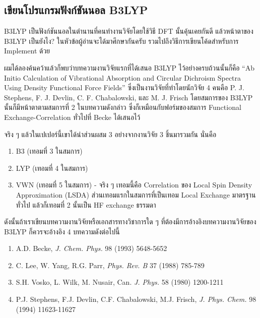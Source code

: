 \subsection{เขียนโปรแกรมฟังก์ชันนอล B3LYP}

B3LYP เป็นฟังก์ชันนอลในตำนานที่คนทำงานวิจัยโดยใช้วิธี DFT นั้นคุ้นเคยกันดี แล้วหน้าตาของ B3LYP เป็นยังไง? ในหัวข้อผู้อ่านจะได้มาศึกษากันครับ
รวมไปถึงวิธีการเขียนโค้ดสำหรับการ Implement ด้วย

ผมได้ลองค้นคว้าแล้วก็พบว่าบทความงานวิจัยแรกที่ได้เสนอ B3LYP ไว้อย่างครบถ้วนนั้นก็คือ \enquote{Ab Initio Calculation of Vibrational
  Absorption and Circular Dichroism Spectra Using Density Functional Force Fields}\autocite{stephens1994}
ซึ่งเป็นงานวิจัยที่ทำโดยนักวิจัย 4 คนคือ P. J. Stephens, F. J. Devlin, C. F. Chabalowski, และ M. J. Frisch โดยสมการของ
B3LYP นั้นก็มีหน้าตาตามสมการที่ 2 ในบทความดังกล่าว ซึ่งก็เหมือนกับฟอร์มของสมการ Functional Exchange-Correlation ทั่วไปที่ Becke
ได้เสนอไว้

จริง ๆ แล้วในเปเปอร์นี้เขาได้นำส่วนผสม 3 อย่างจากงานวิจัย 3 ชิ้นมารวมกัน นั่นคือ

\begin{enumerate}[topsep=0pt,noitemsep]
  \item B3 (เทอมที่ 3 ในสมการ)

  \item LYP (เทอมที่ 4 ในสมการ)

  \item VWN (เทอมที่ 5 ในสมการ) - จริง ๆ เทอมนี้คือ Correlation ของ Local Spin Density Approximation (LSDA)
        ส่วนเทอมแรกในสมการที่เป็นเทอม Local Exchange มาตรฐานทั่วไป แล้วก็เทอมที่ 2 นั้นเป็น HF exchange ธรรมดา
\end{enumerate}

ดังนั้นถ้าเราเขียนบทความงานวิจัยหรือเอกสารทางวิชาการใด ๆ ที่ต้องมีการอ้างอิงบทความงานวิจัยของ B3LYP ก็ควรจะอ้างอิง 4 บทความดังต่อไปนี้

\begin{enumerate}[topsep=0pt,noitemsep]
  \item A.D. Becke, \textit{J. Chem. Phys.} 98 (1993) 5648-5652

  \item C. Lee, W. Yang, R.G. Parr, \textit{Phys. Rev. B} 37 (1988) 785-789

  \item S.H. Vosko, L. Wilk, M. Nusair, Can. \textit{J. Phys.} 58 (1980) 1200-1211

  \item P.J. Stephens, F.J. Devlin, C.F. Chabalowski, M.J. Frisch, \textit{J. Phys. Chem.} 98 (1994) 11623-11627
\end{enumerate}


